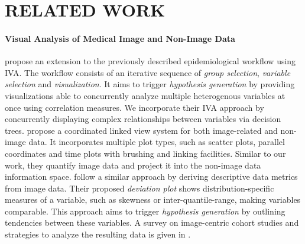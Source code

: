 \documentclass[a4paper,twoside]{style/article}
\begin{document}
\section{\uppercase{Related Work}}
\label{sec:RelatedWork}
\paragraph{Visual Analysis of Medical Image and Non-Image Data}
\cite{Klemm2014VIS} propose an extension to the previously described epidemiological workflow using IVA.
The workflow consists of an iterative sequence of \emph{group selection}, \emph{variable selection} and \emph{visualization}.
It aims to trigger \emph{hypothesis generation} by providing visualizations able to concurrently analyze multiple heterogenous variables at once using correlation measures.
We incorporate their IVA approach by concurrently displaying complex relationships between variables via decision trees.
\cite{Steenwijk} propose a coordinated linked view system for both image-related and non-image data.
It incorporates multiple plot types, such as scatter plots, parallel coordinates and time plots with brushing and linking facilities.
Similar to our work, they quantify image data and project it into the non-image data information space.
\cite{Turkay} follow a similar approach by deriving descriptive data metrics from image data.
Their proposed \emph{deviation plot} shows distribution-specific measures of a variable, such as skewness or inter-quantile-range, making variables comparable.
This approach aims to trigger \emph{hypothesis generation} by outlining tendencies between these variables.
A survey on image-centric cohort studies and strategies to analyze the resulting data is given in \cite{Preim2014}.
\end{document}
